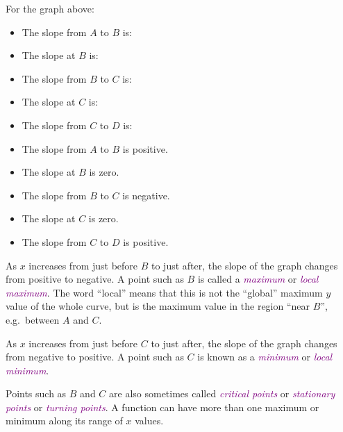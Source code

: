 \documentclass[
  english,
  11pt,
  oneside]{book}
\providecommand{\tightlist}{%
  \setlength{\itemsep}{0pt}\setlength{\parskip}{0pt}}
\newcommand{\slide}{}
\theoremstyle{definition}
\theoremstyle{definition}
\theoremstyle{definition}
\theoremstyle{definition}
\theoremstyle{remark}
\begin{document}
\slide

For the graph above:

\begin{slidesonly}

\begin{itemize}
\tightlist
\item
  The slope from \(A\) to \(B\) is:
\item
  The slope at \(B\) is:
\item
  The slope from \(B\) to \(C\) is:
\item
  The slope at \(C\) is:
\item
  The slope from \(C\) to \(D\) is:
\end{itemize}

\end{slidesonly}

\begin{notslides}

\begin{itemize}
\tightlist
\item
  The slope from \(A\) to \(B\) is positive.
\item
  The slope at \(B\) is zero.
\item
  The slope from \(B\) to \(C\) is negative.
\item
  The slope at \(C\) is zero.
\item
  The slope from \(C\) to \(D\) is positive.
\end{itemize}

\end{notslides}

As \(x\) increases from just before \(B\) to just after, the slope of the graph changes from positive to negative. A point such as \(B\) is called a \textcolor{purple}{\em maximum} or \textcolor{purple}{\em local maximum}. The word ``local'' means that this is not the ``global'' maximum \(y\) value of the whole curve, but is the maximum value in the region ``near \(B\)'', e.g.~between \(A\) and \(C\).

As \(x\) increases from just before \(C\) to just after, the slope of the graph changes from negative to positive. A point such as \(C\) is known as a \textcolor{purple}{\em minimum} or \textcolor{purple}{\em local minimum}.

Points such as \(B\) and \(C\) are also sometimes called \textcolor{purple}{\em critical points} or \textcolor{purple}{\em stationary points} or \textcolor{purple}{\em turning points}. A function can have more than one maximum or minimum along its range of \(x\) values.
\slide
\end{document}
